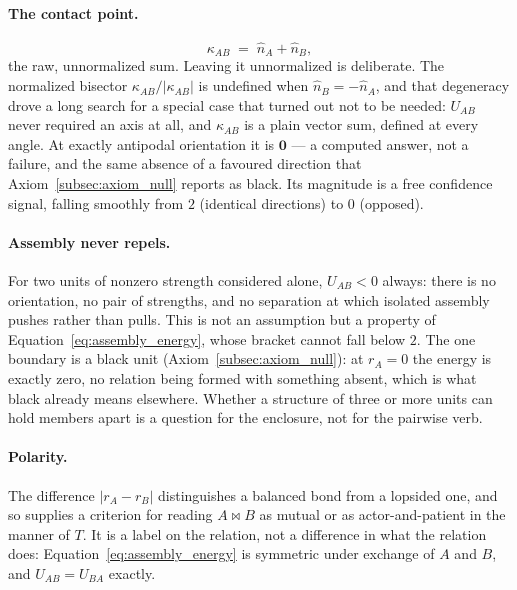 \documentclass[12pt, a4paper]{article}
\begin{document}
\paragraph{The contact point.}
\begin{equation}
    \kappa_{AB} \;=\; \hat n_A + \hat n_B,
    \label{eq:assembly_contact}
\end{equation}
the raw, unnormalized sum. Leaving it unnormalized is deliberate.
The normalized bisector $\kappa_{AB}/\lvert\kappa_{AB}\rvert$ is
undefined when $\hat n_B = -\hat n_A$, and that degeneracy drove a
long search for a special case that turned out not to be needed:
$U_{AB}$ never required an axis at all, and $\kappa_{AB}$ is a plain
vector sum, defined at every angle. At exactly antipodal orientation
it is $\mathbf{0}$ --- a computed answer, not a failure, and the same
absence of a favoured direction that Axiom~\ref{subsec:axiom_null}
reports as black. Its magnitude is a free confidence signal, falling
smoothly from $2$ (identical directions) to $0$ (opposed).

\paragraph{Assembly never repels.}
For two units of nonzero strength considered alone, $U_{AB}<0$
always: there is no orientation, no pair of strengths, and no
separation at which isolated assembly pushes rather than pulls. This
is not an assumption but a property of
Equation~\eqref{eq:assembly_energy}, whose bracket cannot fall below
$2$. The one boundary is a black unit
(Axiom~\ref{subsec:axiom_null}): at $r_A=0$ the energy is exactly
zero, no relation being formed with something absent, which is what
black already means elsewhere. Whether a structure of three or more
units can hold members apart is a question for the enclosure, not
for the pairwise verb.

\paragraph{Polarity.}
The difference $\lvert r_A - r_B\rvert$ distinguishes a balanced bond
from a lopsided one, and so supplies a criterion for reading
$A\bowtie B$ as mutual or as actor-and-patient in the manner of $T$.
It is a label on the relation, not a difference in what the relation
does: Equation~\eqref{eq:assembly_energy} is symmetric under exchange
of $A$ and $B$, and $U_{AB}=U_{BA}$ exactly.
\end{document}
